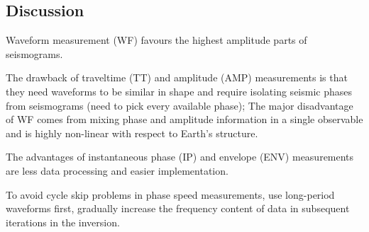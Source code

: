\subsection{Discussion}
Waveform measurement (WF) favours the highest amplitude parts of seismograms.

The drawback of traveltime (TT) and amplitude (AMP) measurements is that
they need waveforms to be similar in shape and require isolating seismic phases from seismograms
(need to pick every available phase);
The major disadvantage of WF comes from mixing phase and amplitude information
in a single observable and is highly non-linear with respect to Earth's structure.

The advantages of instantaneous phase (IP) and envelope (ENV) measurements are
less data processing and easier implementation.

To avoid cycle skip problems in phase speed measurements, use long-period waveforms first,
gradually increase the frequency content of data in subsequent iterations in the inversion.

